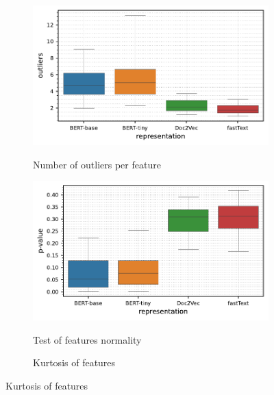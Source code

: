 \begin{figure}[t]
\begin{subfigure}[b]{0.495\textwidth}
        \centering
        \caption{\small Number of outliers per feature}
        \includegraphics[width=\textwidth]{images/real-characteristics/text-banking77/properties-banking77-noutliers(representation,representation)-representation_BERT-base,BERT-tiny,Doc2Vec,fastText-class_0,61-data_ID-train.pdf}
        \label{fig:text-banking77-outliers}
    \end{subfigure}
    \hfill
    \begin{subfigure}[b]{0.495\textwidth}
        \centering
        \caption{\small Test of features normality}
        \includegraphics[width=\textwidth]{images/real-characteristics/text-banking77/properties-banking77-pval(representation,representation)-representation_BERT-base,BERT-tiny,Doc2Vec,fastText-class_0,61-data_ID-train.pdf}
        \label{fig:text-banking77-pvalue}
    \end{subfigure}
    \begin{subfigure}[b]{0.495\textwidth}
        \centering
        \caption{\small Kurtosis of features}

\end{subfigure}
\end{figure}
